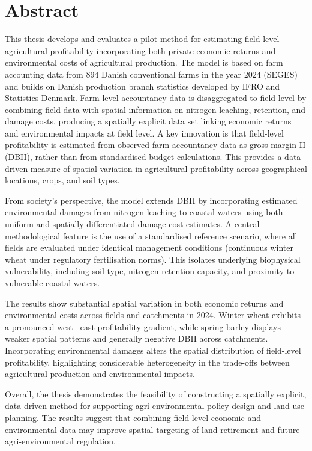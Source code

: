 \documentclass[12pt]{article}
\begin{document}
\section*{Abstract}
This thesis develops and evaluates a pilot method for estimating field-level agricultural profitability incorporating both private economic returns and environmental costs of agricultural production. 
The model is based on farm accounting data from 894 Danish conventional farms in the year 2024 (SEGES) and builds on Danish production branch statistics developed by IFRO and Statistics Denmark. 
Farm-level accountancy data is disaggregated to field level by combining field data with spatial information on nitrogen leaching, retention, and damage costs, producing a spatially explicit data set linking economic returns and environmental impacts at field level.
A key innovation is that field-level profitability is estimated from observed farm accountancy data as gross margin II (DBII), rather than from standardised budget calculations. 
This provides a data-driven measure of spatial variation in agricultural profitability across geographical locations, crops, and soil types.

From society's perspective, the model extends DBII by incorporating estimated environmental damages from nitrogen leaching to coastal waters using both uniform and spatially differentiated damage cost estimates. 
A central methodological feature is the use of a standardised reference scenario, where all fields are evaluated under identical management conditions (continuous winter wheat under regulatory fertilisation norms). This isolates underlying biophysical vulnerability, including soil type, nitrogen retention capacity, and proximity to vulnerable coastal waters.

The results show substantial spatial variation in both economic returns and environmental costs across fields and catchments in 2024. Winter wheat exhibits a pronounced west-–east profitability gradient, while spring barley displays weaker spatial patterns and generally negative DBII across catchments. Incorporating environmental damages alters the spatial distribution of field-level profitability, highlighting considerable heterogeneity in the trade-offs between agricultural production and environmental impacts.

Overall, the thesis demonstrates the feasibility of constructing a spatially explicit, data-driven method for supporting agri-environmental policy design and land-use planning. The results suggest that combining field-level economic and environmental data may improve spatial targeting of land retirement and future agri-environmental regulation.
\end{document}
